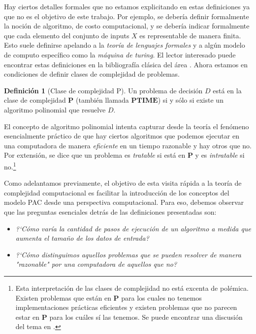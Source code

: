 \documentclass{article}
\theoremstyle{definition}
\newtheorem{definition}{Definici\'on}%
\begin{document}
Hay ciertos detalles formales que no estamos explicitando en estas definiciones ya que no es el objetivo de este trabajo. Por ejemplo, se deber\'ia definir formalmente la noci\'on de algoritmo, de costo computacional, y se deber\'ia indicar formalmente que cada elemento del conjunto de inputs $X$ es representable de manera finita. Esto suele definirse apelando a la \emph{teor\'ia de lenguajes formales} y a alg\'un modelo de computo espec\'ifico como la \emph{m\'aquina de turing}. El lector interesado puede encontrar estas definiciones en la bibliograf\'ia cl\'asica del \'area \cite{cormen01,hopcroft79}. 
Ahora estamos en condiciones de definir clases de complejidad de problemas.

\begin{definition}[Clase de complejidad P]
    \label{def:classp}
    Un problema de decisi\'on $D$ est\'a en la clase de complejidad $\mathbf{P}$ (tambi\'en llamada $\mathbf{PTIME}$) si y s\'olo si existe un algoritmo polinomial que resuelve $D$.
\end{definition}

El concepto de algoritmo polinomial intenta capturar desde la teor\'ia el fen\'omeno esencialmente pr\'actico de que hay ciertos algoritmos que podemos ejecutar en una computadora de manera \emph{eficiente} en un tiempo razonable y hay otros que no. Por extensi\'on, se dice que un problema es \emph{tratable} si est\'a en $\mathbf{P}$ y es \emph{intratable} si no.\footnote{Esta interpretaci\'on de las clases de complejidad no est\'a excenta de pol\'emica. Existen problemas que est\'an en $\mathbf{P}$ para los cuales no tenemos implementaciones pr\'acticas eficientes y existen problemas que no parecen estar en $\mathbf{P}$ para los cu\'ales s\'i las tenemos. Se puede encontrar una discusi\'on del tema en \cite{vardi:ca10}.}

Como adelantamos previamente, el objetivo de esta visita r\'apida a la teor\'ia de complejidad computacional es facilitar la introducci\'on de los conceptos del modelo PAC desde una perspectiva computacional. Para eso, debemos observar que las preguntas esenciales detr\'as de las definiciones presentadas son:
\begin{itemize}
    \item \emph{?`C\'omo var\'ia la cantidad de pasos de ejecuci\'on de un algoritmo a medida que aumenta el tama\~no de los datos de entrada?}
    \item \emph{?`C\'omo distinguimos aquellos problemas que se pueden resolver de manera "razonable" por una computadora de aquellos que no?}
\end{itemize}
\end{document}
